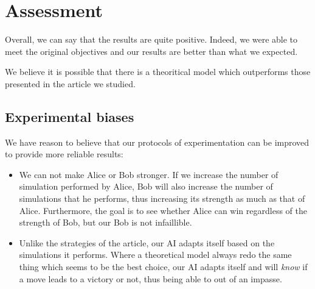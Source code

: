 \section{Assessment}

Overall, we can say that the results are quite positive. Indeed, we were able to meet the original objectives and our results are better than what we expected.

We believe it is possible that there is a theoritical model which outperforms those presented in the article we studied.

\subsection{Experimental biases}

We have reason to believe that our protocols of experimentation can be improved to provide more reliable results:

\begin{itemize}
\item We can not make Alice or Bob stronger. If we increase the number of simulation performed by Alice, Bob will also increase the number of simulations that he performs, thus increasing its strength as much as that of Alice. Furthermore, the goal is to see whether Alice can win regardless of the strength of Bob, but our Bob is not infaillible.
\item Unlike the strategies of the article, our AI adapts itself based on the simulations it performs. Where a theoretical model always redo the same thing which seems to be the best choice, our AI adapts itself and will \textit{know} if a move leads to a victory or not, thus being able to out of an impasse.
\end{itemize}


